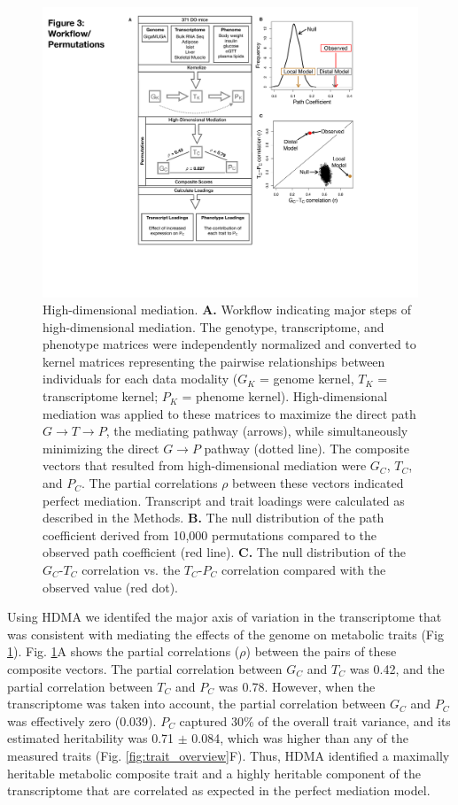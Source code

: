 \documentclass[
]{article}
\begin{document}
\begin{figure}[ht!]
\includegraphics[width=5in]{Figures/Fig3_workflow.pdf} 
\caption{High-dimensional mediation. \textbf{A.} Workflow indicating 
major steps of high-dimensional mediation. The genotype, transcriptome, 
and phenotype matrices were independently normalized and converted to 
kernel matrices representing the pairwise relationships between 
individuals for each data modality ($G_K$ = genome kernel, $T_K$ = 
transcriptome kernel; $P_K$ = phenome kernel). 
High-dimensional mediation was applied to these matrices to maximize the 
direct path $G \rightarrow T \rightarrow P$, the mediating pathway (arrows), 
while simultaneously minimizing the direct $G \rightarrow P$ pathway (dotted 
line). The composite vectors that resulted from high-dimensional mediation were 
$G_C$, $T_C$, and $P_C$. The partial correlations $\rho$ between these vectors 
indicated perfect mediation. Transcript and trait loadings were calculated 
as described in the Methods. \textbf{B.} The null distribution of the path 
coefficient derived from 10,000 permutations compared to the observed path 
coefficient (red line). \textbf{C.} The null distribution of the $G_C$-$T_C$ 
correlation vs. the $T_C$-$P_C$ correlation compared with the observed value 
(red dot).
}
\label{fig:workflow}
\end{figure}

Using HDMA we identifed the major axis of variation in the transcriptome
that was consistent with mediating the effects of the genome on
metabolic traits (Fig \ref{fig:workflow}). Fig. \ref{fig:workflow}A
shows the partial correlations (\(\rho\)) between the pairs of these
composite vectors. The partial correlation between \(G_C\) and \(T_C\)
was 0.42, and the partial correlation between \(T_C\) and \(P_C\) was
0.78. However, when the transcriptome was taken into account, the
partial correlation between \(G_C\) and \(P_C\) was effectively zero
(0.039). \(P_C\) captured 30\% of the overall trait variance, and its
estimated heritability was 0.71 \(\pm\) 0.084, which was higher than any
of the measured traits (Fig. \ref{fig:trait_overview}F). Thus, HDMA
identified a maximally heritable metabolic composite trait and a highly
heritable component of the transcriptome that are correlated as expected
in the perfect mediation model.
\end{document}
